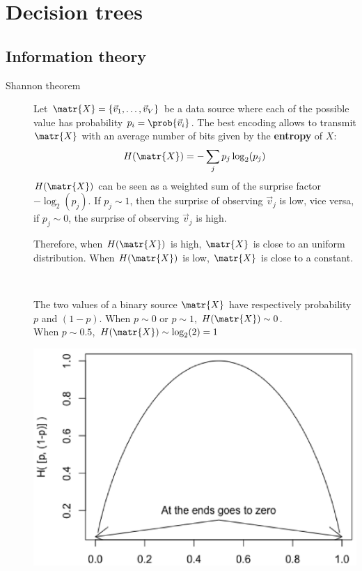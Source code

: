 \section{Decision trees}

\subsection{Information theory} \label{sec:information_theory}

\begin{description}
    \item[Shannon theorem] 
        Let $\matr{X} = \{ \vec{v}_1, \dots, \vec{v}_V \}$ be a data source where 
        each of the possible value has probability $p_i = \prob{\vec{v}_i}$.
        The best encoding allows to transmit $\matr{X}$ with 
        an average number of bits given by the \textbf{entropy} of $X$: 
        \[ H(\matr{X}) = - \sum_j p_j \log_2(p_j) \]
        $H(\matr{X})$ can be seen as a weighted sum of the surprise factor $-\log_2(p_j)$.
        If $p_j \sim 1$, then the surprise of observing $\vec{v}_j$ is low, vice versa,
        if $p_j \sim 0$, the surprise of observing $\vec{v}_j$ is high.
        
        Therefore, when $H(\matr{X})$ is high, $\matr{X}$ is close to an uniform distribution.
        When $H(\matr{X})$ is low, $\matr{X}$ is close to a constant.

        \begin{example} \phantom{}\\
            \begin{minipage}{.50\linewidth}
                The two values of a binary source $\matr{X}$ have respectively probability $p$ and $(1-p)$.
                When $p \sim 0$ or $p \sim 1$, $H(\matr{X}) \sim 0$.\\
                When $p \sim 0.5$, $H(\matr{X}) \sim \log_2(2)=1$
            \end{minipage}
            \begin{minipage}{.45\linewidth}
                \centering
                \includegraphics[width=\linewidth]{img/binary_entropy.png}
            \end{minipage}
        \end{example}


\end{description}
